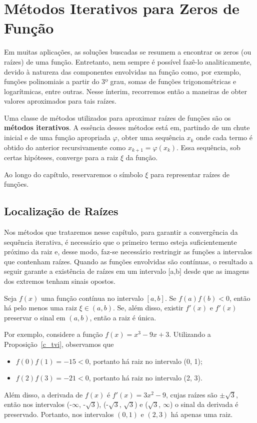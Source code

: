 \chapter{Métodos Iterativos para Zeros de Função}

Em muitas aplicações, as soluções buscadas se resumem a encontrar os zeros (ou
raízes) de uma função. Entretanto, nem sempre é possível fazê-lo
analiticamente, devido à natureza das componentes envolvidas na função como,
por exemplo, funções polinomiais a partir do 3º grau, somas de funções
trigonométricas e logarítmicas, entre outras. Nesse ínterim, recorremos então a
maneiras de obter valores aproximados para tais raízes.

Uma classe de métodos utilizados para aproximar raízes de funções são os
\textbf{métodos iterativos}. A essência desses métodos está em, partindo de um
chute inicial e de uma função apropriada $\varphi$, obter uma sequência $x_k$
onde cada termo é obtido do anterior recursivamente como $x_{k+1} =
    \varphi(x_k)$. Essa sequência, sob certas hipóteses, converge para a raiz $\xi$
da função.

Ao longo do capítulo, reservaremos o símbolo $\xi$ para representar raízes de
funções.

\section{Localização de Raízes}

Nos métodos que trataremos nesse capítulo, para garantir a convergência da
sequência iterativa, é necessário que o primeiro termo esteja suficientemente
próximo da raiz e, desse modo, faz-se necessário restringir as funções a
intervalos que contenham raízes. Quando as funções envolvidas são contínuas, o
resultado a seguir garante a existência de raízes em um intervalo [a,b] desde
que as imagens dos extremos tenham sinais opostos.

\begin{prop}\label{c_tvi}%
    Seja $f(x)$ uma função contínua no intervalo $[a, b]$. Se $f(a)f(b) < 0$, então há pelo menos uma raiz $\xi \in (a,b)$. Se, além disso, existir $f'(x)$ e $f'(x)$ preservar o sinal em $(a,b)$, então a raiz é única.
\end{prop} %
Por exemplo, considere a função $f(x) = x^3 - 9x + 3$. Utilizando a Proposição~\ref{c_tvi}, observamos que
\begin{itemize}
    \item $f(0)f(1) = -15 < 0$, portanto há raiz no intervalo (0, 1);
    \item $f(2)f(3) = -21 < 0$, portanto há raiz no intervalo (2, 3).
\end{itemize}
Além disso, a derivada de $f(x)$ é $f'(x) = 3x^2 - 9$, cujas raízes são $\pm \sqrt{3}$, então nos intervalos (-$\infty$, -$\sqrt{3}$), (-$\sqrt{3}$, $\sqrt{3}$) e ($\sqrt{3}$, $\infty$) o sinal da derivada é preservado. Portanto, nos intervalos $(0, 1)$ e $(2, 3)$ há apenas uma raiz.

